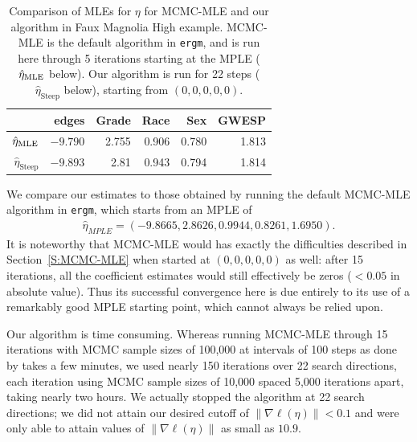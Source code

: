 \begin{table}[h!]  
\begin{center} 
\caption[Comparison of MLEs for $\eta$ for MCMC-MLE and our algorithm in Faux Magnolia High example]{Comparison of MLEs for $\eta$ for MCMC-MLE and our algorithm in Faux Magnolia High example.  MCMC-MLE is the default algorithm
in \texttt{ergm}, and is run here through 5 iterations starting
at the MPLE ($\hat{\eta}_{\textrm{MLE}}$ below).
Our algorithm is run for 22 steps ($\hat{\eta}_{\textrm{Steep}}$ below),
starting from $(0,0,0,0,0)$.\\
}
\begin{tabular}{rrrrrr}
  \hline
 & edges & Grade & Race & Sex & GWESP \\ 
  \hline
$\hat{\eta}_{\textrm{MLE}}$ & $-9.790$ & 2.755 & 0.906 & 0.780 & 1.813 \\ 
$\hat{\eta}_{\textrm{Steep}}$ & 	$-9.893$	&	2.81	&	0.943	&	0.794	&	1.814 \\ 
   \hline
\end{tabular}\label{T:FauxMagnolia}
\end{center}
\end{table}
%
%
We compare our estimates to those obtained by running the default MCMC-MLE algorithm 
in \texttt{ergm}, which starts from an MPLE of
\begin{align*}
	\hat{\eta}_{MPLE } = ( -9.8665, 2.8626, 0.9944, 0.8261, 1.6950 ).
\end{align*}
It is noteworthy that MCMC-MLE would has exactly the difficulties 
described in Section~\ref{S:MCMC-MLE} when started at $(0, 0, 0, 0, 0)$ 
as well:
after 15 iterations, all the coefficient estimates would still effectively be zeros
($< 0.05$ in absolute value).
Thus its successful convergence here is due entirely to its use of 
a remarkably good MPLE starting point, which cannot always be relied upon.

Our algorithm is time consuming.  Whereas running MCMC-MLE through 15 iterations with MCMC sample sizes of 100,000 at intervals of 100 steps as done 
by \citet{statnet-tutorial} takes a few minutes, 
we used nearly 150 iterations over 22 search directions, 
each iteration using MCMC sample sizes of 
10,000 spaced 5,000 iterations apart, taking nearly two hours.  We actually stopped the 
algorithm at 22 search directions; we did not attain our desired cutoff of 
$\lVert \nabla \ell(\eta) \rVert < 0.1$ and were only able to 
attain values of $\lVert \nabla \ell(\eta) \rVert$ as small as $10.9$.
 
